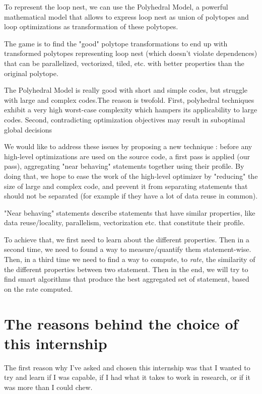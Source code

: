 \documentclass[paper=a4, fontsize=11.5pt]{scrartcl}
\numberwithin{equation}{section}        %
\numberwithin{figure}{section}          %
\numberwithin{table}{section}               %
\begin{document}
To represent the loop nest, we can use the Polyhedral Model, a powerful mathematical model
that allows to express loop nest as union of polytopes and loop optimizations as
transformation of these polytopes.

The game is to find the "good" polytope transformations to end up with
transformed polytopes representing loop nest (which doesn't violate dependences) 
that can be parallelized, vectorized, tiled, etc. with better properties than the original
polytope.

The Polyhedral Model is really good with short and simple codes, but struggle with
large and complex codes.The reason is twofold. First, polyhedral techniques exhibit
a very high worst-case complexity which hampers its applicability to large codes.
Second, contradicting optimization objectives may result in suboptimal global
decisions


We would like to address these issues by proposing a new technique : before any
high-level optimizations are used on the source code, a first pass is applied (our pass),
aggregating "near behaving" statements together using their profile.
By doing that, we hope to ease the work of the high-level optimizer by "reducing" the size
of large and complex code, and prevent it from separating statements that should
not be separated (for example if they have a lot of data reuse in common).

"Near behaving" statements describe statements that have similar properties,
like data reuse/locality, parallelism, vectorization etc. that constitute their profile.

To achieve that, we first need to learn about the different properties. Then in a second
time, we need to found a way to measure/quantify them statement-wise. Then, in a third
time we need to find a way to compute, to \textit{rate}, the similarity of the different
properties between two statement. Then in the end, we will try to find smart algorithms
that produce the best aggregated set of statement, based on the rate computed.

\section{The reasons behind the choice of this internship}
The first reason why I've asked and chosen this internship was that I wanted to try and learn
if I was capable, if I had what it takes to work in research, or if it was more than I could
chew.
\end{document}
